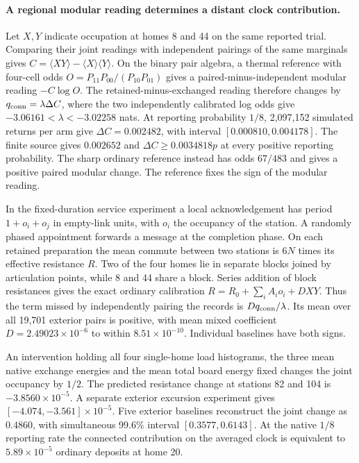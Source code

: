 \documentclass[11pt]{article}
\begin{document}
\paragraph{A regional modular reading determines a distant clock contribution.}
Let \(X,Y\) indicate occupation at homes 8 and 44 on the same reported
trial. Comparing their joint readings with independent pairings of the
same marginals gives \(C=\langle XY\rangle-\langle X\rangle\langle
Y\rangle\). On the binary pair algebra, a thermal reference with
four-cell odds \(O=P_{11}P_{00}/(P_{10}P_{01})\) gives a
paired-minus-independent modular reading \(-C\log O\).
The retained-minus-exchanged reading therefore changes by
\(q_{\rm conn}=\lambda\Delta C\), where the two independently
calibrated log odds give \(-3.06161<\lambda<-3.02258\) nats.
At reporting probability \(1/8\), 2,097,152 simulated returns per
arm give \(\Delta C=0.002482\), with interval \([0.000810,0.004178]\).
The finite source gives \(0.002652\) and
\(\Delta C\ge0.0034818p\) at every positive reporting probability.
The sharp ordinary reference instead has odds \(67/483\) and gives
a positive paired modular change. The reference fixes the sign of
the modular reading.

In the fixed-duration service experiment a local acknowledgement has
period \(1+o_i+o_j\) in empty-link units, with \(o_i\) the occupancy
of the station. A randomly phased appointment forwards a message at
the completion phase. On each retained preparation the mean commute
between two stations is \(6N\) times its effective resistance \(R\).
Two of the four homes lie in separate blocks joined by articulation
points, while 8 and 44 share a block. Series addition of block
resistances gives the exact ordinary calibration
\(R=R_0+\sum_i A_i o_i+DXY\). Thus the term missed by independently
pairing the records is \(Dq_{\rm conn}/\lambda\). Its mean over all
19,701 exterior pairs is positive, with mean mixed coefficient
\(D=2.49023\times10^{-6}\) to within \(8.51\times10^{-10}\).
Individual baselines have both signs.

An intervention holding all four single-home load histograms, the
three mean native exchange energies and the mean total board energy
fixed changes the joint occupancy by \(1/2\). The predicted
resistance change at stations 82 and 104 is
\(-3.8560\times10^{-5}\). A separate exterior excursion experiment
gives \([-4.074,-3.561]\times10^{-5}\). Five exterior baselines
reconstruct the joint change as \(0.4860\), with simultaneous
99.6\% interval \([0.3577,0.6143]\). At the native \(1/8\)
reporting rate the connected contribution on the averaged clock
is equivalent to \(5.89\times10^{-5}\) ordinary deposits at home 20.
\end{document}
